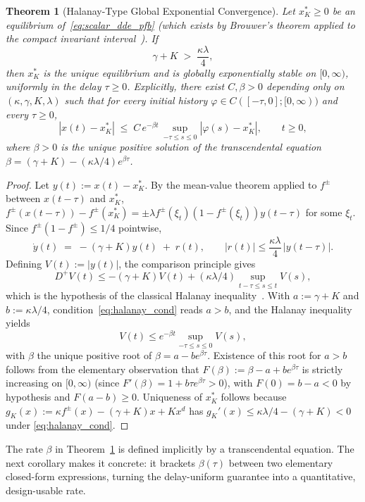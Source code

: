 \documentclass[12pt]{article}
\newtheorem{theorem}{Theorem}
\newcommand{\fpm}{f^{\pm}}
\begin{document}
\begin{theorem}[Halanay-Type Global Exponential Convergence]
\label{thm:halanay}
Let $x^{*}_{K}\ge 0$ be an equilibrium of~\eqref{eq:scalar_dde_pfb}
(which exists by Brouwer's theorem applied to the compact invariant
interval~\cite{belgacem2026extensions}). If
\begin{equation}
\gamma+K \;>\; \frac{\kappa\lambda}{4},
\label{eq:halanay_cond}
\end{equation}
then $x^{*}_{K}$ is the unique equilibrium and is \emph{globally
exponentially stable} on $[0,\infty)$, \emph{uniformly in the delay}
$\tau\ge 0$. Explicitly, there exist $C,\beta>0$ depending only on
$(\kappa,\gamma,K,\lambda)$ such that for every initial history
$\varphi\in C([-\tau,0];[0,\infty))$ and every $\tau\ge 0$,
\[
|x(t)-x^{*}_{K}| \;\le\; C\,e^{-\beta t}\,
                       \sup_{-\tau\le s\le 0}|\varphi(s)-x^{*}_{K}|,
\qquad t\ge 0,
\]
where $\beta>0$ is the unique positive solution of the transcendental
equation $\beta=(\gamma+K)-(\kappa\lambda/4)e^{\beta\tau}$.
\end{theorem}

\begin{proof}
Let $y(t):=x(t)-x^{*}_{K}$. By the mean-value theorem applied to
$\fpm$ between $x(t-\tau)$ and $x^{*}_{K}$,
$\fpm(x(t-\tau))-\fpm(x^{*}_{K})=\pm\lambda\fpm(\xi_t)(1-\fpm(\xi_t))y(t-\tau)$
for some $\xi_t$. Since $\fpm(1-\fpm)\le 1/4$ pointwise,
\[
\dot y(t) \;=\; -(\gamma+K)y(t) \;+\; r(t),
\qquad |r(t)|\le \frac{\kappa\lambda}{4}\,|y(t-\tau)|.
\]
Defining $V(t):=|y(t)|$, the comparison principle gives
\[
D^{+}V(t)\le -(\gamma+K)V(t)+(\kappa\lambda/4)\sup_{t-\tau\le s\le t}V(s),
\]
which is the hypothesis of the classical Halanay
inequality~\cite{halanay1966differential}. With $a:=\gamma+K$ and
$b:=\kappa\lambda/4$, condition~\eqref{eq:halanay_cond} reads $a>b$,
and the Halanay inequality yields
\[
V(t)\le e^{-\beta t}\sup_{-\tau\le s\le 0}V(s),
\]
with $\beta$ the unique positive root of $\beta=a-be^{\beta\tau}$.
Existence of this
root for $a>b$ follows from the elementary observation that
$F(\beta):=\beta-a+be^{\beta\tau}$ is strictly increasing on
$[0,\infty)$ (since $F'(\beta)=1+b\tau e^{\beta\tau}>0$), with
$F(0)=b-a<0$ by hypothesis and $F(a-b)\ge 0$.
Uniqueness of $x^{*}_{K}$ follows because
$g_{K}(x):=\kappa\fpm(x)-(\gamma+K)x+Kx^{d}$ has
$g_{K}'(x)\le\kappa\lambda/4-(\gamma+K)<0$ under
\eqref{eq:halanay_cond}.
\end{proof}

The rate $\beta$ in Theorem~\ref{thm:halanay} is defined implicitly by a
transcendental equation. The next corollary makes it concrete: it
brackets $\beta(\tau)$ between two elementary closed-form expressions,
turning the delay-uniform guarantee into a quantitative,
design-usable rate.
\end{document}
